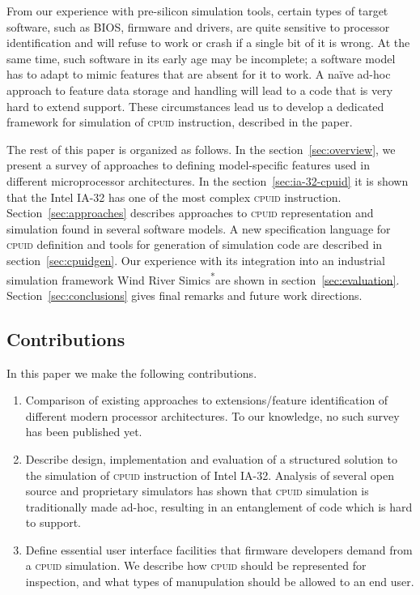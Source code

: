 \documentclass[a4paper,10pt,oneside,unicode]{article}
\newcommand{\cpuid}{\textsc{cpuid} }
\newcommand{\othercopyright}{\textsuperscript{*}}
\begin{document}
From our experience with pre-silicon simulation tools, certain types of target software, such as BIOS, firmware and drivers, are quite sensitive to processor identification and will refuse to work or crash if a single bit of it is wrong. At the same time, such software in its early age may be incomplete; a software model has to adapt to mimic features that are absent for it to work. A naïve ad-hoc approach to feature data storage and handling will lead to a code that is very hard to extend support. These circumstances lead us to develop a dedicated framework for simulation of \cpuid instruction, described in the paper.

The rest of this paper is organized as follows. In the section~\ref{sec:overview}, we present a survey of approaches to defining model-specific features used in different microprocessor architectures. In the section~\ref{sec:ia-32-cpuid} it is shown that the Intel IA-32 has one of the most complex \cpuid instruction. Section~\ref{sec:approaches} describes approaches to \cpuid representation and simulation found in several software models. A new specification language for \cpuid definition and tools for generation of simulation code are described in section~\ref{sec:cpuidgen}. Our experience with its integration  into an industrial simulation framework Wind River Simics\othercopyright are shown in section~\ref{sec:evaluation}. Section~\ref{sec:conclusions} gives final remarks and future work directions.

\subsection{Contributions}

In this paper we make the following contributions.
\begin{enumerate}
\item Comparison of existing approaches to extensions/feature identification of different modern processor architectures. To our knowledge, no such survey has been published yet.
\item Describe design, implementation and evaluation of a structured solution to the simulation of \cpuid instruction of Intel IA-32. Analysis of several open source and proprietary simulators has shown that \cpuid simulation is traditionally made ad-hoc, resulting in an entanglement of code which is hard to support.
\item Define essential user interface facilities that firmware developers demand from a \cpuid simulation. We describe how \cpuid should be represented for inspection, and what types of manupulation should be allowed to an end user.
\end{enumerate}
\end{document}
